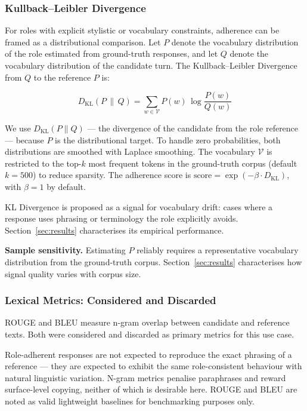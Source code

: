 \documentclass[11pt,a4paper]{article}
\begin{document}
\subsubsection{Kullback--Leibler Divergence}

For roles with explicit stylistic or vocabulary constraints, adherence can be
framed as a distributional comparison. Let $P$ denote the vocabulary
distribution of the role estimated from ground-truth responses, and let $Q$
denote the vocabulary distribution of the candidate turn. The
Kullback--Leibler Divergence \citep{kullback1951information} from $Q$ to the
reference $P$ is:

\begin{equation}
  D_{\mathrm{KL}}(P \,\|\, Q) =
  \sum_{w \in \mathcal{V}} P(w)\, \log \frac{P(w)}{Q(w)}
  \label{eq:kl}
\end{equation}

We use $D_{\mathrm{KL}}(P \| Q)$ --- the divergence of the candidate from
the role reference --- because $P$ is the distributional target. To handle
zero probabilities, both distributions are smoothed with Laplace smoothing.
The vocabulary $\mathcal{V}$ is restricted to the top-$k$ most frequent
tokens in the ground-truth corpus (default $k = 500$) to reduce sparsity.
The adherence score is $\text{score} = \exp(-\beta \cdot D_{\mathrm{KL}})$,
with $\beta = 1$ by default.

KL Divergence is proposed as a signal for vocabulary drift: cases where a
response uses phrasing or terminology the role explicitly avoids.
Section~\ref{sec:results} characterises its empirical performance.

\textbf{Sample sensitivity.} Estimating $P$ reliably requires a
representative vocabulary distribution from the ground-truth corpus.
Section~\ref{sec:results} characterises how signal quality varies with
corpus size.

\subsubsection{Lexical Metrics: Considered and Discarded}

ROUGE and BLEU measure n-gram overlap between candidate and reference texts.
Both were considered and discarded as primary metrics for this use case.

Role-adherent responses are not expected to reproduce the exact phrasing of a
reference --- they are expected to exhibit the same role-consistent behaviour
with natural linguistic variation. N-gram metrics penalise paraphrases and
reward surface-level copying, neither of which is desirable here. ROUGE and
BLEU are noted as valid lightweight baselines for benchmarking purposes only.
\end{document}
